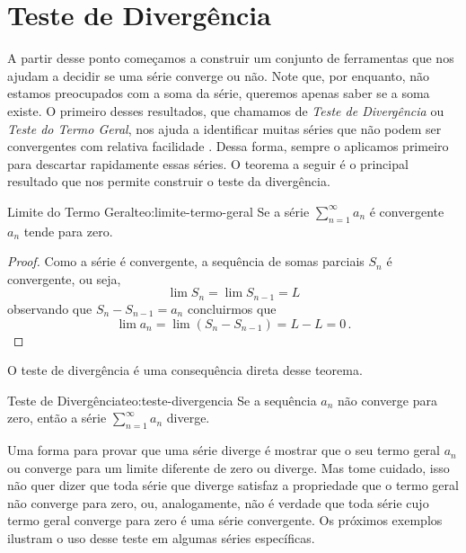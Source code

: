 \section{Teste de Divergência}

A partir desse ponto começamos a construir um conjunto de ferramentas
que nos ajudam a decidir se uma série converge ou não.
Note que, por enquanto, não estamos preocupados com a soma da série,
queremos apenas saber se a soma existe.
O primeiro desses resultados, que chamamos de
\emph{Teste de Divergência} ou
\emph{Teste do Termo Geral},
nos ajuda a identificar muitas séries que não podem ser
convergentes com relativa facilidade .
Dessa forma, sempre o aplicamos primeiro para descartar rapidamente essas séries.
O teorema a seguir é o principal resultado que nos permite
construir o teste da divergência.

\begin{teorema}{Limite do Termo Geral}{teo:limite-termo-geral}
  Se a série
  \(
    \sum_{n=1}^\infty a_n
  \)
  é convergente $a_n$ tende para zero.
\end{teorema}
\begin{proof}
  Como a série é convergente, a sequência de somas parciais
  $S_n$ é convergente, ou seja,
  \[
    \lim S_n=\lim S_{n-1}=L
  \]
  observando que $S_n-S_{n-1}=a_n$ concluirmos que
  \[
    \lim a_n
    = \lim (S_n-S_{n-1})
    = L - L
    = 0              \,.
  \]
\end{proof}

O teste de divergência é uma consequência direta desse teorema.

\begin{teorema}{Teste de Divergência}{teo:teste-divergencia}
  Se
  a sequência $a_n$ não converge para zero, então a série
  \(
    \sum_{n=1}^\infty a_n
  \)
  diverge.
\end{teorema}

Uma forma para provar que uma série diverge é mostrar que o seu termo geral $a_n$
ou converge para um limite diferente de zero ou diverge. Mas tome cuidado, isso não quer
dizer que toda série que diverge satisfaz a propriedade que o termo geral não converge
para zero, ou, analogamente, não é verdade que toda série cujo termo geral converge para
zero é uma série convergente. Os próximos exemplos ilustram o uso desse teste em
algumas séries específicas.

